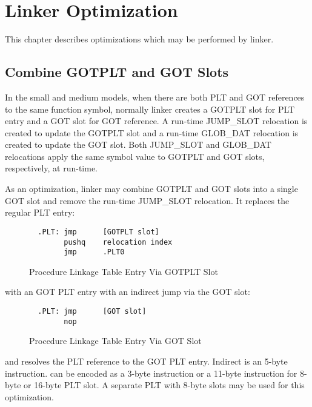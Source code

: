 \chapter{Linker Optimization}

This chapter describes optimizations which may be performed by linker.

\section{Combine GOTPLT and GOT Slots}
In the small and medium models, when there are both PLT and GOT references
to the same function symbol, normally linker creates a GOTPLT slot for PLT
entry and a GOT slot for GOT reference.  A run-time JUMP_SLOT relocation is
created to update the GOTPLT slot and a run-time GLOB_DAT relocation is
created to update the GOT slot.  Both JUMP_SLOT and GLOB_DAT relocations
apply the same symbol value to GOTPLT and GOT slots, respectively, at
run-time.

As an optimization, linker may combine GOTPLT and GOT slots into a single
GOT slot and remove the run-time JUMP_SLOT relocation.  It replaces the
regular PLT entry:

\begin{figure}[H]
\Hrule
\caption{Procedure Linkage Table Entry Via GOTPLT Slot}
\label{gotplt_plt}
\begin{footnotesize}
\begin{verbatim}
  .PLT: jmp      [GOTPLT slot]
        pushq    relocation index
        jmp      .PLT0
\end{verbatim}
\end{footnotesize}
\Hrule
\end{figure}

\noindent
with an GOT PLT entry with an indirect jump via the GOT slot:
\indent

\begin{figure}[H]
\Hrule
\caption{Procedure Linkage Table Entry Via GOT Slot}
\label{got_plt}
\begin{footnotesize}
\begin{verbatim}
  .PLT: jmp      [GOT slot]
        nop
\end{verbatim}
\end{footnotesize}
\Hrule
\end{figure}

\noindent
and resolves the PLT reference to the GOT PLT entry.  Indirect 
is an 5-byte instruction.   can be encoded as a 3-byte
instruction or a 11-byte instruction for 8-byte or 16-byte PLT slot.
A separate PLT with 8-byte slots may be used for this optimization.
\indent

